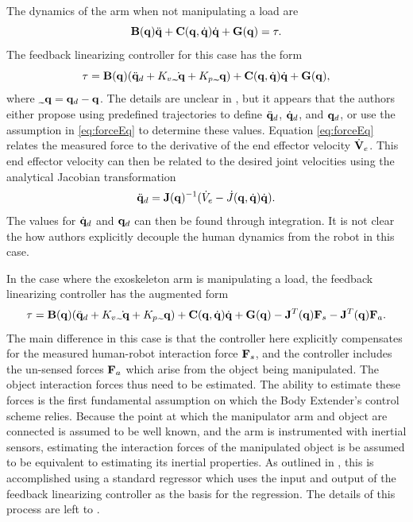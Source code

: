 \begin{refsection}
The dynamics of the arm when not manipulating a load are
\begin{equation}
{\bf B}({\bf q}) \ddot{{\bf q}} + {\bf C}({\bf q},\dot{{\bf q}})\dot{{\bf q}} + {\bf G}({\bf q}) = {\bf \tau}. \notag
\end{equation} 
The feedback linearizing controller for this case has the form
\begin{equation}
{\bf \tau} = \mB(\vq)(\ddot{\vq}_d + K_v \dot{\tilde{\vq}} + K_p \tilde{\vq}) + \mC(\vq,\dot{\vq})\dot{\vq} + \mG(\vq), \notag
\end{equation}
where $\tilde{\vq} = \vq_d - \vq$.  The details are unclear in \cite{body_control_2012}, but it appears that the authors either propose using predefined trajectories to define $\ddot{{\bf q}}_d$, $\dot{{\bf q}}_d$, and ${\bf q}_d$, or use the assumption in \eqref{eq:forceEq} to determine these values.  
Equation \ref{eq:forceEq} relates the measured force to the derivative of the end effector velocity $\dot{{\bf V}}_e$.  This end effector velocity can then be related to the desired joint velocities using the analytical Jacobian transformation \[ \ddot{{\bf q}}_d = {\bf J}({\bf q})^{-1}(\dot{V}_e - \dot{J}({\bf q},\dot{{\bf q}})\dot{{\bf q}}).\]  The values for $\dot{{\bf q}}_d$ and ${\bf q}_d$ can then be found through integration.  It is not clear the how authors explicitly decouple the human dynamics from the robot in this case.

In the case where the exoskeleton arm is manipulating a load, the feedback linearizing controller has the augmented form
\begin{equation}
{\bf \tau} = \mB(\vq)(\ddot{\vq}_d + K_v \dot{\tilde{\vq}} + K_p \tilde{\vq}) + \mC(\vq,\dot{\vq})\dot{\vq} + \mG(\vq) -\mJ^T(\vq) \vF_s -\mJ^T(\vq)\vF_a. \notag
\end{equation}
The main difference in this case is that the controller here explicitly compensates for the measured human-robot interaction force ${\bf F}_s$, and the controller includes the un-sensed forces ${\bf F}_a$ which arise from the object being manipulated.  The object interaction forces thus need to be estimated.  The ability to estimate these forces is the first fundamental assumption on which the Body Extender's control scheme relies.  Because the point at which the manipulator arm and object are connected is assumed to be well known, and the arm is instrumented with inertial sensors, estimating the interaction forces of the manipulated object is be assumed to be equivalent to estimating its inertial properties.  As outlined in \cite{body_control_2012}, this is accomplished using a standard regressor which uses the input and output of the feedback linearizing controller as the basis for the regression.  The details of this process are left to \cite{body_control_2012}.


\end{refsection}
